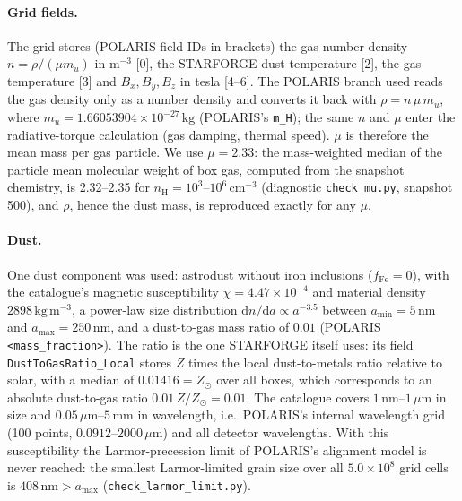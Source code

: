 \paragraph{Grid fields.} The grid stores (POLARIS field IDs in brackets) the gas number density
$n=\rho/(\mu m_u)$ in $\mathrm{m^{-3}}$ [0], the STARFORGE dust temperature [2], the gas temperature [3] and
$B_x, B_y, B_z$ in tesla [4--6]. The POLARIS branch used reads the gas density only as a number density and
converts it back with $\rho=n\,\mu\,m_u$, where $m_u=1.66053904\times10^{-27}\,\mathrm{kg}$ (POLARIS's
\texttt{m\_H}); the same $n$ and $\mu$ enter the radiative-torque calculation (gas damping, thermal speed).
$\mu$ is therefore the mean mass per gas particle. We use $\mu=2.33$: the mass-weighted median of the particle
mean molecular weight of box gas, computed from the snapshot chemistry, is 2.32--2.35 for
$n_\mathrm{H}=10^{3}$--$10^{6}\,\mathrm{cm^{-3}}$ (diagnostic \texttt{check\_mu.py}, snapshot 500), and
$\rho$, hence the dust mass, is reproduced exactly for any $\mu$.

\paragraph{Dust.} One dust component was used: astrodust \citep{Hensley2023} without iron inclusions
($f_\mathrm{Fe}=0$), with the catalogue's magnetic susceptibility $\chi=4.47\times10^{-4}$ and material density
$2898\,\mathrm{kg\,m^{-3}}$, a power-law size distribution $\mathrm{d}n/\mathrm{d}a\propto a^{-3.5}$
\citep{Mathis1977} between $a_\mathrm{min}=5\,\mathrm{nm}$ and $a_\mathrm{max}=250\,\mathrm{nm}$, and a
dust-to-gas mass ratio of $0.01$ (POLARIS \texttt{<mass\_fraction>}). The ratio is the one STARFORGE itself
uses: its field \texttt{DustToGasRatio\_Local} stores $Z$ times the local dust-to-metals ratio relative to solar,
with a median of $0.01416=Z_\odot$ over all boxes, which corresponds to an absolute dust-to-gas ratio
$0.01\,Z/Z_\odot = 0.01$. The catalogue covers $1\,\mathrm{nm}$--$1\,\mu\mathrm{m}$ in size and
$0.05\,\mu\mathrm{m}$--$5\,\mathrm{mm}$ in wavelength, i.e.\ POLARIS's internal wavelength grid
(100 points, $0.0912$--$2000\,\mu\mathrm{m}$) and all detector wavelengths. With this susceptibility the
Larmor-precession limit of POLARIS's alignment model is never reached: the smallest Larmor-limited grain size
over all $5.0\times10^{8}$ grid cells is $408\,\mathrm{nm}>a_\mathrm{max}$ (\texttt{check\_larmor\_limit.py}).

